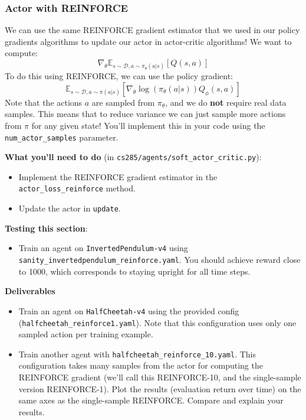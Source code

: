 \subsubsection{Actor with REINFORCE}
We can use the same REINFORCE gradient estimator that we used in our policy gradients algorithms to update our actor in actor-critic algorithms! We want to compute:
\[\nabla_\theta\mathbb{E}_{s \sim \mathcal{D}, a \sim \pi_\theta(a|s)}\left[Q(s, a)\right]\]
To do this using REINFORCE, we can use the policy gradient:
\[\mathbb{E}_{s \sim \mathcal{D}, a \sim \pi(a|s)}\left[\nabla_\theta \log(\pi_\theta(a|s))Q_\phi(s, a)\right]\]
Note that the actions $a$ are sampled from $\pi_\theta$, and we do \textbf{not} require real data samples. This means that to reduce variance we can just sample more actions from $\pi$ for any given state! You'll implement this in your code using the \verb|num_actor_samples| parameter.

\textbf{What you'll need to do} (in \verb|cs285/agents/soft_actor_critic.py|):
\begin{itemize}
    \item Implement the REINFORCE gradient estimator in the \verb|actor_loss_reinforce| method.
    \item Update the actor in \verb|update|.
\end{itemize}

\textbf{Testing this section}:
\begin{itemize}
    \item Train an agent on \verb|InvertedPendulum-v4| using \verb|sanity_invertedpendulum_reinforce.yaml|. You should achieve reward close to 1000, which corresponds to staying upright for all time steps.
\end{itemize}

\textbf{Deliverables}
\begin{itemize}
    \item Train an agent on \verb|HalfCheetah-v4| using the provided config (\verb|halfcheetah_reinforce1.yaml|). Note that this configuration uses only one sampled action per training example.

    \item Train another agent with \verb|halfcheetah_reinforce_10.yaml|. This configuration takes many samples from the actor for computing the REINFORCE gradient (we'll call this REINFORCE-10, and the single-sample version REINFORCE-1). Plot the results (evaluation return over time) on the same axes as the single-sample REINFORCE. Compare and explain your results.
\end{itemize}

